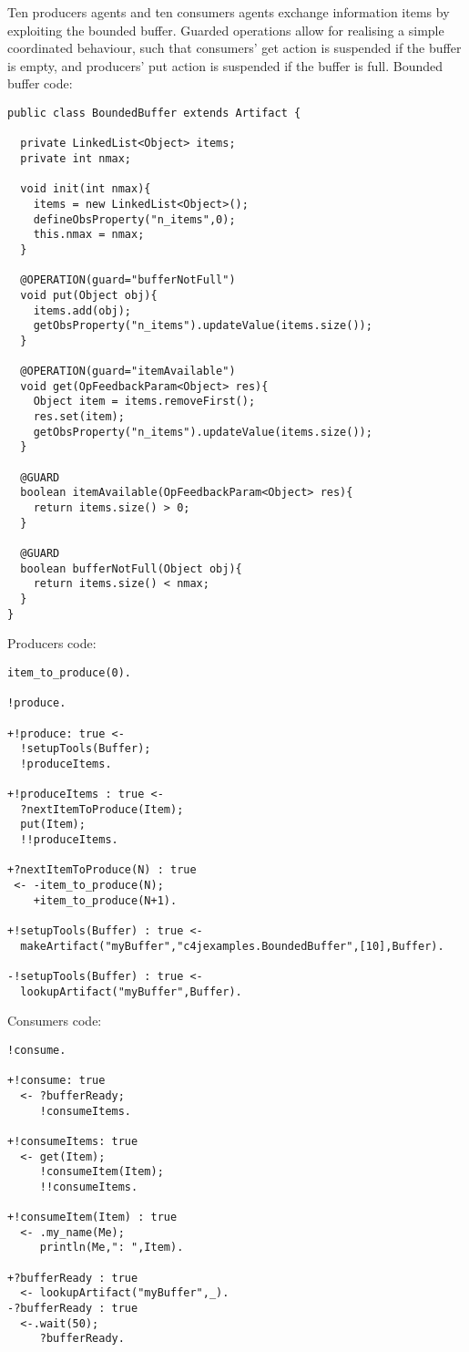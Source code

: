 \documentclass[11pt]{report}
\begin{document}
%
\noindent Ten producers agents and ten consumers agents exchange information items by exploiting the bounded buffer.
%
Guarded operations allow for realising a simple coordinated behaviour, such that consumers' get action is suspended if the buffer is empty, and producers' put action is suspended if the buffer is full.
%
\noindent Bounded buffer code:

%
{\small{
\begin{verbatim}
public class BoundedBuffer extends Artifact {

  private LinkedList<Object> items;
  private int nmax;
	
  void init(int nmax){
    items = new LinkedList<Object>();
    defineObsProperty("n_items",0);
    this.nmax = nmax;
  }
	
  @OPERATION(guard="bufferNotFull") 
  void put(Object obj){
    items.add(obj);
    getObsProperty("n_items").updateValue(items.size());
  }
	
  @OPERATION(guard="itemAvailable") 
  void get(OpFeedbackParam<Object> res){
    Object item = items.removeFirst();
    res.set(item);
    getObsProperty("n_items").updateValue(items.size());
  }
	
  @GUARD 
  boolean itemAvailable(OpFeedbackParam<Object> res){
    return items.size() > 0;
  }

  @GUARD 
  boolean bufferNotFull(Object obj){
    return items.size() < nmax;
  }		
}
\end{verbatim}}}
%

\noindent Producers code:

{\small{\begin{verbatim}
item_to_produce(0).

!produce.

+!produce: true <- 
  !setupTools(Buffer);
  !produceItems.
	  
+!produceItems : true <- 
  ?nextItemToProduce(Item);
  put(Item);
  !!produceItems.

+?nextItemToProduce(N) : true 
 <- -item_to_produce(N);
    +item_to_produce(N+1).

+!setupTools(Buffer) : true <- 	
  makeArtifact("myBuffer","c4jexamples.BoundedBuffer",[10],Buffer).

-!setupTools(Buffer) : true <- 	
  lookupArtifact("myBuffer",Buffer).
\end{verbatim}}}

\noindent Consumers code:
{\small{\begin{verbatim}
!consume.

+!consume: true 
  <- ?bufferReady;
     !consumeItems.
    
+!consumeItems: true 
  <- get(Item);
     !consumeItem(Item);
     !!consumeItems.

+!consumeItem(Item) : true 
  <- .my_name(Me);
     println(Me,": ",Item).
  
+?bufferReady : true 
  <- lookupArtifact("myBuffer",_).  
-?bufferReady : true 
  <-.wait(50);
     ?bufferReady.
\end{verbatim}}}
\end{document}
